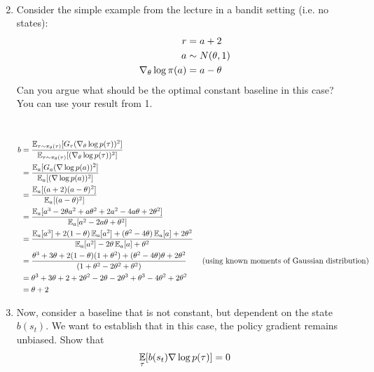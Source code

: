 \documentclass{exam}
\begin{document}
\begin{enumerate}
\begin{solutionorlines}[2in]
\begin{align*}
    \end{align*}
    \end{solutionorlines}
    \item Consider the simple example from the lecture in a bandit setting (i.e. no states):
    \begin{align*}
        r &= a + 2\\
        a &\sim N(\theta, 1)\\
        \nabla_{\theta} \log \pi(a) &= a - \theta
    \end{align*}
    Can you argue what should be the optimal constant baseline in this case? You can use your result from 1.
    \begin{solutionorlines}[2in]
    \ \newline
    \begin{align*}
        b &= \frac{\operatorname*{\mathbb{E}}_{\tau \sim \pi_{\theta}(\tau)}[G_{\tau} (\nabla_{\theta} \log p(\tau))^2]}{\operatorname*{\mathbb{E}}_{\tau \sim \pi_{\theta}(\tau)}[(\nabla_{\theta} \log p(\tau))^2]}\\
        &= \frac{\operatorname*{\mathbb{E}}_{a}[G_{a} (\nabla \log p(a))^2]}{\operatorname*{\mathbb{E}}_{a}[(\nabla \log p(a))^2]}\\
        &= \frac{\operatorname*{\mathbb{E}}_{a}[(a+2)(a-\theta)^2]}{\operatorname*{\mathbb{E}}_{a}[(a-\theta)^2]}\\
        &= \frac{\operatorname*{\mathbb{E}}_{a}[a^3 - 2\theta a^2 + a \theta^2 + 2a^2 - 4a \theta + 2 \theta^2]}{\operatorname*{\mathbb{E}}_{a}[a^2 -2 a \theta +\theta^2]}\\
        &= \frac{\operatorname*{\mathbb{E}}_{a}[a^3] + 2(1-\theta) \operatorname*{\mathbb{E}}_{a}[a^2] + (\theta^2 -4 \theta)\operatorname*{\mathbb{E}}_{a}[a] + 2\theta^2}{\operatorname*{\mathbb{E}}_{a}[a^2] - 2\theta \operatorname*{\mathbb{E}}_{a}[a] + \theta^2}\\
        &= \frac{\theta^3 + 3\theta + 2(1-\theta)(1+\theta^2) + (\theta^2 -4\theta)\theta + 2\theta^2}{(1 + \theta^2 -2\theta^2 + \theta^2)} \tag{using known moments of Gaussian distribution}\\
        &= \theta^3 + 3\theta + 2 + 2 \theta^2 -2 \theta -2\theta^3 + \theta^3 -4\theta^2 + 2\theta^2\\
        &= \theta + 2
    \end{align*}
    \end{solutionorlines}
    \item Now, consider a baseline that is not constant, but dependent on the state $b(s_t)$. We want to establish that in this case, the policy gradient remains unbiased. Show that
    \begin{align*}
        \expectation_{\tau}[b(s_t) \nabla \log{p(\tau)}] = 0

\end{align*}
\end{enumerate}
\end{document}
